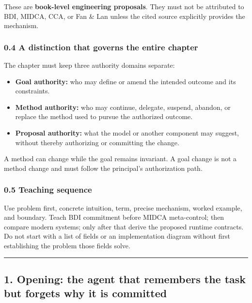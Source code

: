 These are \textbf{book-level engineering proposals}. They must not be attributed to BDI, MIDCA, CCA, or Fan \& Lan unless the cited source explicitly provides the mechanism.

\subsubsection{0.4 A distinction that governs the entire chapter}\label{a-distinction-that-governs-the-entire-chapter}

The chapter must keep three authority domains separate:

\begin{itemize}
\tightlist
\item
  \textbf{Goal authority:} who may define or amend the intended outcome and its constraints.
\item
  \textbf{Method authority:} who may continue, delegate, suspend, abandon, or replace the method used to pursue the authorized outcome.
\item
  \textbf{Proposal authority:} what the model or another component may suggest, without thereby authorizing or committing the change.
\end{itemize}

A method can change while the goal remains invariant. A goal change is not a method change and must follow the principal's authorization path.

\subsubsection{0.5 Teaching sequence}\label{teaching-sequence}

Use problem first, concrete intuition, term, precise mechanism, worked example, and boundary. Teach BDI commitment before MIDCA meta-control; then compare modern systems; only after that derive the proposed runtime contracts. Do not start with a list of fields or an implementation diagram without first establishing the problem those fields solve.

\begin{center}\rule{0.5\linewidth}{0.5pt}\end{center}

\subsection{1. Opening: the agent that remembers the task but forgets why it is committed}\label{opening-the-agent-that-remembers-the-task-but-forgets-why-it-is-committed}

